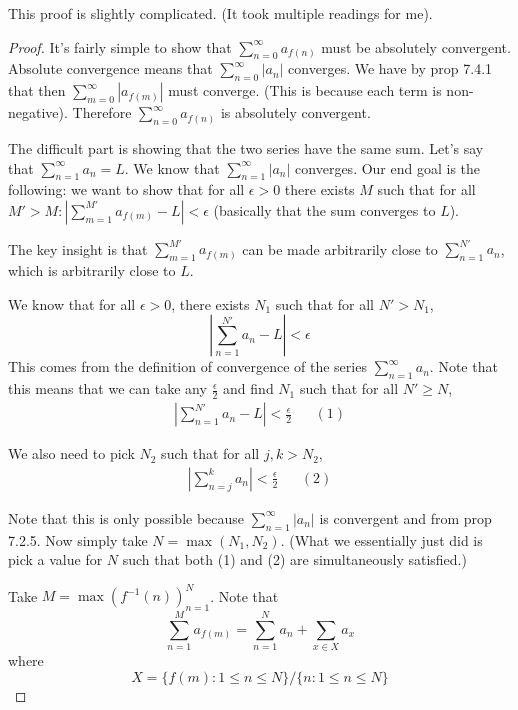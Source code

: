 \documentclass[answers,12pt]{exam}
\begin{document}
\begin{solution}
    This proof is slightly complicated.
    (It took multiple readings for me).
    \begin{proof}
        It's fairly simple to show that $\sum_{n=0}^{\infty} a_{f(n)}$ must be absolutely convergent.
        Absolute convergence means that $\sum_{n=0}^{\infty} |a_n|$ converges.
        We have by prop 7.4.1 that then $\sum_{m=0}^{\infty} |a_{f(m)}|$ must converge.
        (This is because each term is non-negative).
        Therefore $\sum_{n=0}^{\infty} a_{f(n)}$ is absolutely convergent.

        The difficult part is showing that the two series have the same sum.
        Let's say that $\sum_{n=1}^{\infty} a_n = L$.
        We know that $\sum_{n=1}^{\infty} |a_n|$ converges.
        Our end goal is the following: we want to show that for all $\epsilon > 0$ there exists  $M$ such that for all $M' > M: |\sum_{m=1}^{M'} a_{f(m)} -L| < \epsilon$ (basically that the sum converges to $L$).

        The key insight is that $\sum_{m=1}^{M'} a_{f(m)}$ can be made arbitrarily close to $\sum_{n=1}^{N'} a_n$, which is arbitrarily close to $L$.

        We know that for all $\epsilon >0$, there exists $N_1$ such that for all $N'> N_1$, 
        \[
            \left | \sum_{n=1}^{N'}a_n - L \right | < \epsilon
        \]
        This comes from the definition of convergence of the series $\sum_{n=1}^{\infty} a_n$.
        Note that this means that we can take any $\frac{\epsilon}{2}$ and find $N_1$ such that for all $N' \geq N$, 
        \begin{align*}
        \left | \sum_{n=1}^{N'} a_n - L \right |  < \frac{\epsilon}{2} && (1)
        \end{align*}

        We also need to pick $N_2$ such that for all $j,k > N_2$, 
        \begin{align*}
            \left | \sum_{n=j}^k a_n \right | < \frac{\epsilon}{2} && (2)
        \end{align*}

        Note that this is only possible because $\sum_{n=1}^{\infty} |a_n|$ is convergent and from prop 7.2.5.
        Now simply take $N = \max(N_1, N_2)$.
        (What we essentially just did is pick a value for $N$ such that both (1) and (2) are simultaneously satisfied.)

        Take $M = \max(f^{-1}(n))_{n=1}^{N}$.
        Note that 
        \[
            \sum_{n=1}^{M} a_{f(m)} = \sum_{n=1}^{N} a_n + \sum_{x \in X} a_x
        \]
        where 
        \[
            X = \{ f(m): 1 \leq n \leq N\} / \{ n: 1 \leq n \leq N\}
        \]


\end{proof}
\end{solution}
\end{document}
